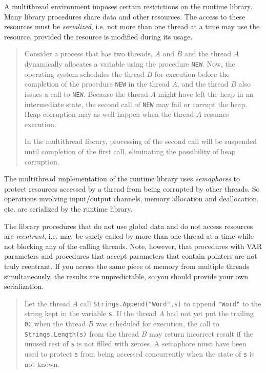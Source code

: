 A multithread environment imposes certain restrictions on the runtime library.
Many library procedures share data and other resources. The access to these
resources must be {\em serialized}, i.e. not more than one thread at a time
may use the resource, provided the resource is modified during its usage.

\begin{quotation}
{\footnotesize
Consider a process that has two threads, $A$ and $B$ and the thread $A$
dynamically allocates a variable using the procedure \verb'NEW'. Now, the
operating system schedules the thread $B$ for execution before the completion
of the procedure \verb'NEW' in the thread $A$, and the thread $B$ also
issues a call to \verb'NEW'. Because the thread $A$ might have left the
heap in an intermediate state, the second call of \verb'NEW' may fail or
corrupt the heap. Heap corruption may as well happen when the thread $A$
resumes execution.

In the multithread library, processing of the second call will be suspended
until completion of the first call, eliminating the possibility of heap
corruption.
} %
\end{quotation}

The multithread implementation of the \XDS{} runtime library uses
{\em semaphores} to protect resources accessed by a thread from
being corrupted by other threads. So operations involving input/output
channels, memory allocation and deallocation, etc. are serialized
by the runtime library.

The library procedures that do not use global data and do not access
resources are {\em reentrant}, i.e. may be safely called by more than one
thread at a time while not blocking any of the calling threads.
Note, however, that procedures with VAR parameters and procedures that
accept parameters that contain pointers are not truly reentrant.
If you access the same piece of memory from multiple threads simultaneously,
the results are unpredictable, so you should provide your own serialization.

\begin{quotation}
{\footnotesize
Let the thread $A$ call {\verb'Strings.Append("Word",s)'} to append \verb'"Word"'
to the string kept in the variable \verb's'. If the thread $A$ had not yet
put the trailing \verb'0C' when the thread $B$ was scheduled for execution,
the call to {\verb'Strings.Length(s)'} from the thread $B$ may return
incorrect result if the unused rest of \verb's' is not filled with zeroes.
A semaphore must have been used to protect \verb's' from being accessed
concurrently when the state of \verb's' is not known.
} %
\end{quotation}


